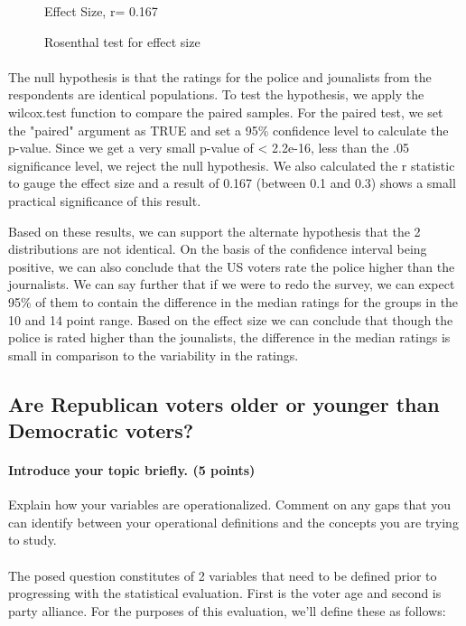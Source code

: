 \documentclass[12pt]{article}
\begin{document}
\begin{figure}[H]
\begin{Schunk}
\begin{Soutput}
Effect Size, r= 0.167
\end{Soutput}
\end{Schunk}
\caption{Rosenthal test for effect size}
\end{figure}

\paragraph{}
The null hypothesis is that the ratings for the police and jounalists from the respondents are identical populations. To test the hypothesis, we apply the wilcox.test function to compare the paired samples. For the paired test, we set the "paired" argument as TRUE and set a 95\% confidence level to calculate the p-value. Since we get a very small p-value of < 2.2e-16, less than the .05 significance level, we reject the null hypothesis. We also calculated the r statistic to gauge the effect size and a result of 0.167 (between 0.1 and 0.3) shows a small practical significance of this result.

Based on these results, we can support the alternate hypothesis that the 2 distributions are not identical. On the basis of the confidence interval being positive, we can also conclude that the US voters rate the police higher than the journalists. We can say further that if we were to redo the survey, we can expect 95\% of them to contain the difference in the median ratings for the groups in the 10 and 14 point range. Based on the effect size we can conclude that though the police is rated higher than the jounalists, the difference in the median ratings is small in comparison to the variability in the ratings.   

\subsection{Are Republican voters older or younger than Democratic voters?}
\paragraph{Introduce your topic briefly. (5 points)}
Explain how your variables are operationalized. Comment on any gaps that you can identify between your operational definitions and the concepts you are trying to study.

\paragraph{}
The posed question constitutes of 2 variables that need to be defined prior to progressing with the statistical evaluation. First is the voter age and second is party alliance. For the purposes of this evaluation, we'll define these as follows:
\end{document}
